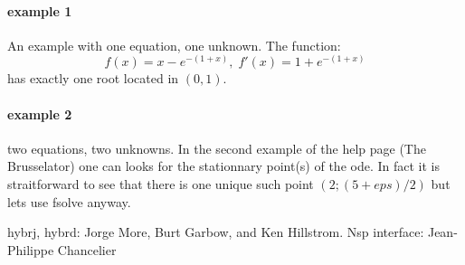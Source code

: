 \begin{examples}
  
\paragraph{example 1} An example with one equation, one unknown. The function:
$$
  f(x) = x - e^{-(1+x)}, \; f'(x) = 1 + e^{-(1+x)}
$$ 
has exactly one root located in $(0,1)$.
\begin{program}
\end{program}
 
\paragraph{example 2} two equations, two unknowns. In the second example
of the  help page (The Brusselator) one can looks for
the stationnary point(s) of the ode. In fact it is straitforward to see
that there is one unique such point $(2;(5+eps)/2)$ but lets use fsolve
anyway.
\begin{program}
\end{program}
\end{examples}

\begin{manseealso}
\end{manseealso}

\begin{authors}
 hybrj, hybrd: Jorge More, Burt Garbow, and Ken Hillstrom. Nsp interface: Jean-Philippe Chancelier
\end{authors}

